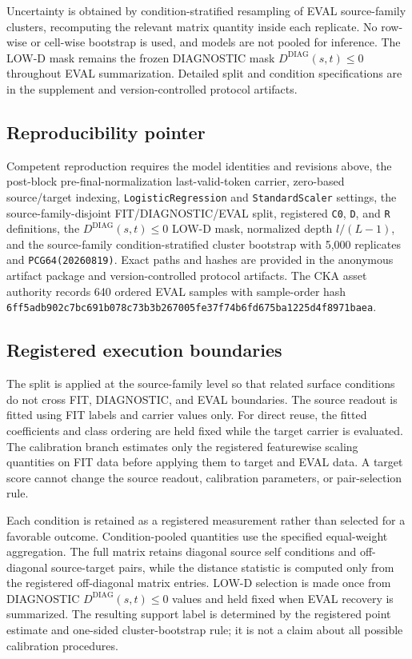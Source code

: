 \documentclass{article}
\begin{document}
Uncertainty is obtained by condition-stratified resampling of EVAL source-family clusters, recomputing the relevant matrix quantity inside each replicate. No row-wise or cell-wise bootstrap is used, and models are not pooled for inference. The LOW-D mask remains the frozen DIAGNOSTIC mask $D^{\mathrm{DIAG}}(s,t)\leq0$ throughout EVAL summarization. Detailed split and condition specifications are in the supplement and version-controlled protocol artifacts.

\subsection{Reproducibility pointer}
Competent reproduction requires the model identities and revisions above, the post-block pre-final-normalization last-valid-token carrier, zero-based source/target indexing, \texttt{LogisticRegression} and \texttt{StandardScaler} settings, the source-family-disjoint FIT/DIAGNOSTIC/EVAL split, registered \texttt{C0}, \texttt{D}, and \texttt{R} definitions, the $D^{\mathrm{DIAG}}(s,t)\leq0$ LOW-D mask, normalized depth $l/(L-1)$, and the source-family condition-stratified cluster bootstrap with 5,000 replicates and \texttt{PCG64(20260819)}. Exact paths and hashes are provided in the anonymous artifact package and version-controlled protocol artifacts. The CKA asset authority records 640 ordered EVAL samples with sample-order hash \texttt{6ff5adb902c7bc691b078c73b3b267005fe37f74b6fd675ba1225d4f8971baea}.

\subsection{Registered execution boundaries}
The split is applied at the source-family level so that related surface conditions do not cross FIT, DIAGNOSTIC, and EVAL boundaries. The source readout is fitted using FIT labels and carrier values only. For direct reuse, the fitted coefficients and class ordering are held fixed while the target carrier is evaluated. The calibration branch estimates only the registered featurewise scaling quantities on FIT data before applying them to target and EVAL data. A target score cannot change the source readout, calibration parameters, or pair-selection rule.

Each condition is retained as a registered measurement rather than selected for a favorable outcome. Condition-pooled quantities use the specified equal-weight aggregation. The full matrix retains diagonal source self conditions and off-diagonal source-target pairs, while the distance statistic is computed only from the registered off-diagonal matrix entries. LOW-D selection is made once from DIAGNOSTIC $D^{\mathrm{DIAG}}(s,t)\leq0$ values and held fixed when EVAL recovery is summarized. The resulting support label is determined by the registered point estimate and one-sided cluster-bootstrap rule; it is not a claim about all possible calibration procedures.
\end{document}
